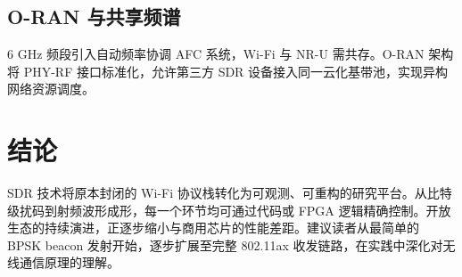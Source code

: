 \section{O-RAN 与共享频谱}
6 GHz 频段引入自动频率协调 AFC 系统，Wi-Fi 与 NR-U 需共存。O-RAN 架构将 PHY-RF 接口标准化，允许第三方 SDR 设备接入同一云化基带池，实现异构网络资源调度。\par
\chapter{结论}
SDR 技术将原本封闭的 Wi-Fi 协议栈转化为可观测、可重构的研究平台。从比特级扰码到射频波形成形，每一个环节均可通过代码或 FPGA 逻辑精确控制。开放生态的持续演进，正逐步缩小与商用芯片的性能差距。建议读者从最简单的 BPSK beacon 发射开始，逐步扩展至完整 802.11ax 收发链路，在实践中深化对无线通信原理的理解。\par
